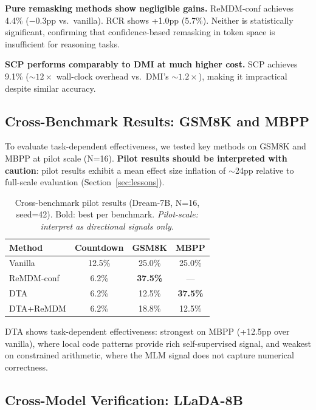 \documentclass{article}
\begin{document}
\textbf{Pure remasking methods show negligible gains.} ReMDM-conf achieves 4.4\% ($-$0.3pp vs.\ vanilla). RCR shows +1.0pp (5.7\%). Neither is statistically significant, confirming that confidence-based remasking in token space is insufficient for reasoning tasks.

\textbf{SCP performs comparably to DMI at much higher cost.} SCP achieves 9.1\% (${\sim}12{\times}$ wall-clock overhead vs.\ DMI's ${\sim}1.2{\times}$), making it impractical despite similar accuracy.

\subsection{Cross-Benchmark Results: GSM8K and MBPP}
\label{sec:cross_bench}

To evaluate task-dependent effectiveness, we tested key methods on GSM8K and MBPP at pilot scale (N=16). \textbf{Pilot results should be interpreted with caution}: pilot results exhibit a mean effect size inflation of ${\sim}$24pp relative to full-scale evaluation (Section~\ref{sec:lessons}).

\begin{table}[t]
\centering
\caption{Cross-benchmark pilot results (Dream-7B, N=16, seed=42). Bold: best per benchmark. \emph{Pilot-scale: interpret as directional signals only.}}
\label{tab:crossbench}
\small
\begin{tabular}{lccc}
\toprule
\textbf{Method} & \textbf{Countdown} & \textbf{GSM8K} & \textbf{MBPP} \\
\midrule
Vanilla & 12.5\% & 25.0\% & 25.0\% \\
ReMDM-conf & 6.2\% & \textbf{37.5\%} & --- \\
DTA & 6.2\% & 12.5\% & \textbf{37.5\%} \\
DTA+ReMDM & 6.2\% & 18.8\% & 12.5\% \\
\bottomrule
\end{tabular}
\end{table}

DTA shows task-dependent effectiveness: strongest on MBPP (+12.5pp over vanilla), where local code patterns provide rich self-supervised signal, and weakest on constrained arithmetic, where the MLM signal does not capture numerical correctness.

\subsection{Cross-Model Verification: LLaDA-8B}
\label{sec:cross_model}
\end{document}
